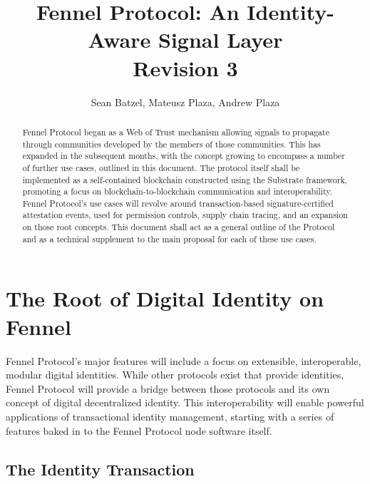 \documentclass[]{article}
\title{Fennel Protocol: An Identity-Aware Signal Layer\\\large{Revision 3}}
\author{Sean Batzel, Mateusz Plaza, Andrew Plaza}
\begin{document}
\maketitle
\begin{abstract}
Fennel Protocol began as a Web of Trust mechanism allowing signals to propagate through communities developed by the members of those communities. This has expanded in the subsequent months, with the concept growing to encompass a number of further use cases, outlined in this document. The protocol itself shall be implemented as a self-contained blockchain constructed using the Substrate framework, promoting a focus on blockchain-to-blockchain communication and interoperability. Fennel Protocol's use cases will revolve around transaction-based signature-certified attestation events, used for permission controls, supply chain tracing, and an expansion on those root concepts. This document shall act as a general outline of the Protocol and as a technical supplement to the main proposal for each of these use cases.
\end{abstract}
\clearpage

\tableofcontents

\listoffigures
\listoftables
\nocite{*}
\clearpage

\section{The Root of Digital Identity on Fennel}
\label{scrivauto:10}

Fennel Protocol's major features will include a focus on extensible, interoperable, modular digital identities. While other protocols exist that provide identities, Fennel Protocol will provide a bridge between those protocols and its own concept of digital decentralized identity. This interoperability will enable powerful applications of transactional identity management, starting with a series of features baked in to the Fennel Protocol node software itself.

\subsection{The Identity Transaction}
\label{scrivauto:11}
\end{document}
